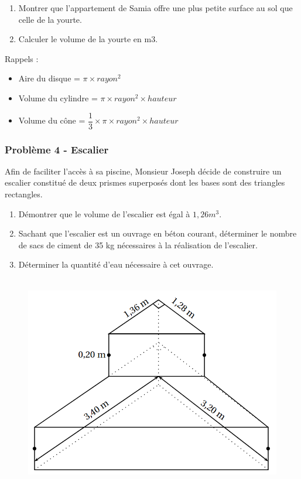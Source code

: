 \documentclass[11pt]{article}
\begin{document}
\begin{enumerate}
\item Montrer que l’appartement de Samia offre une plus petite surface au sol que celle de la yourte.
\item Calculer le volume de la yourte en m3.
\end{enumerate}
  
Rappels : 

\begin{itemize}
  \item Aire du disque = $\pi \times rayon^2$
  \item Volume du cylindre = $\pi \times rayon^2 \times hauteur$
  \item Volume du cône = $\dfrac{1}{3} \times \pi \times rayon^2 \times hauteur$
\end{itemize}

\begin{multicols}{2}

\subsubsection*{Problème 4 - Escalier}

  Afin de faciliter l'accès à sa piscine, Monsieur Joseph décide de construire un escalier constitué de deux prismes superposés dont les bases sont des triangles rectangles.

  \begin{enumerate}
  \item Démontrer que le volume de l'escalier est égal à $1,26 m^3$.
  \item Sachant que l'escalier est un ouvrage en béton courant, déterminer le nombre de sacs de ciment de 35 kg nécessaires à la réalisation de l'escalier.
  \item Déterminer la quantité d'eau nécessaire à cet ouvrage.
  \end{enumerate}

  \begin{figure}[H]
        \centering
        \includegraphics[width=\linewidth]{3x3-volumes-1/sources/escalier.png}
  \end{figure}


\end{multicols}
\end{document}
